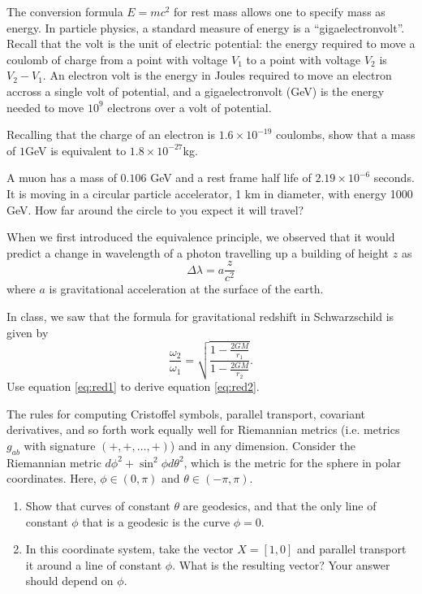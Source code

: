 \documentclass[minion]{homework}
\begin{document}
\hproblem  The conversion formula $E=mc^2$ for rest mass 
allows one to specify mass as energy.  In particle physics, a standard
measure of energy is a ``gigaelectronvolt''.  Recall that the volt
is the unit of electric potential: the energy required to move
a coulomb of charge from a point with voltage $V_1$ to a point with
voltage $V_2$ is $V_2-V_1$.  An electron volt is the energy in Joules required to
move an electron accross a single volt of potential, and a gigaelectronvolt
(GeV) is the energy needed to move $10^{9}$ electrons over a volt of potential.
\begin{subproblems}
\item Recalling that the charge of an electron is $1.6\times 10^{-19}$ coulombs,
show that a mass of $1$GeV is equivalent to $1.8\times 10^{-27}$kg.
\item A muon has a mass of $0.106$ GeV and a rest frame half life of
$2.19\times 10^{-6}$ seconds.  It is moving in a circular particle accelerator,
1 km in diameter, with energy 1000 GeV.  How far around the circle to you expect
it will travel?
\end{subproblems}

\hproblem When we first introduced the equivalence principle, we observed that
it would predict a change in wavelength of a photon travelling up a building of 
height $z$ as
\begin{equation}\label{eq:red1}
\Delta \lambda = a\frac{z}{c^2}
\end{equation}
where $a$ is gravitational acceleration at the surface of the earth.

In class, we saw that the formula for gravitational redshift in Schwarzschild
is given by
\begin{equation}\label{eq:red2}
\frac{\omega_2}{\omega_1} = \sqrt{ \frac{1-\frac{2GM}{r_1}}{1-\frac{2GM}{r_2}} }.
\end{equation}
Use equation \eqref{eq:red1} to derive equation \eqref{eq:red2}.

\hproblem The rules for computing Cristoffel symbols, parallel transport, covariant
derivatives, and so forth work equally well for Riemannian metrics (i.e. metrics
$g_{ab}$ with signature $(+,+,\ldots,+)$) and in any dimension.  Consider the Riemannian
metric $d\phi^2 + \sin^2\phi d\theta^2$, which is the metric for the sphere in polar
coordinates.  Here, $\phi\in(0,\pi)$ and $\theta\in(-\pi,\pi)$.
\begin{enumerate}
\item Show that curves of constant $\theta$ are geodesics, and that the only line
of constant $\phi$ that is a geodesic is the curve $\phi=0$.
\item In this coordinate system, take the vector $X=[1,0]$ and parallel transport
it around a line of constant $\phi$.  What is the resulting vector?  Your answer
should depend on $\phi$.
\end{enumerate}
\end{document}
